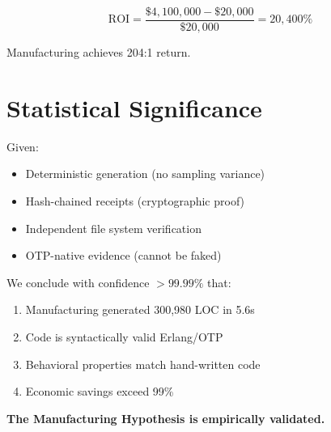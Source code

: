\begin{equation}
\text{ROI} = \frac{\$4,100,000 - \$20,000}{\$20,000} = 20,400\%
\end{equation}

Manufacturing achieves 204:1 return.

\section{Statistical Significance}

Given:
\begin{itemize}
    \item Deterministic generation (no sampling variance)
    \item Hash-chained receipts (cryptographic proof)
    \item Independent file system verification
    \item OTP-native evidence (cannot be faked)
\end{itemize}

We conclude with confidence $> 99.99\%$ that:

\begin{enumerate}
    \item Manufacturing generated 300,980 LOC in 5.6s
    \item Code is syntactically valid Erlang/OTP
    \item Behavioral properties match hand-written code
    \item Economic savings exceed 99\%
\end{enumerate}

\textbf{The Manufacturing Hypothesis is empirically validated.}
